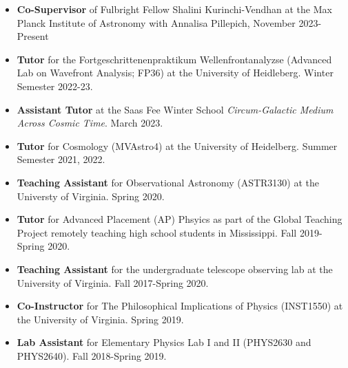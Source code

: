 \documentclass[a4paper,10pt,oneside]{article}
\begin{document}
\begin{itemize}[wide, labelwidth=!, labelindent=-11pt, parsep=0pt]
    \item {\bf Co-Supervisor} of Fulbright Fellow Shalini Kurinchi-Vendhan at the Max Planck Institute of Astronomy with Annalisa Pillepich, November 2023-Present
    \item {\bf Tutor} for the Fortgeschrittenenpraktikum Wellenfrontanalyzse (Advanced Lab on Wavefront Analysis; FP36) at the University of Heidleberg. Winter Semester 2022-23.
    \item {\bf Assistant Tutor} at the Saas Fee Winter School {\it Circum-Galactic Medium Across Cosmic Time}. March 2023. 
    \item {\bf Tutor} for Cosmology (MVAstro4) at the University of Heidelberg. Summer Semester 2021, 2022.
    \item {\bf Teaching Assistant} for Observational Astronomy (ASTR3130) at the Universty of Virginia. Spring 2020.
    \item {\bf Tutor} for Advanced Placement (AP) Phsyics as part of the Global Teaching Project remotely teaching high school students in Mississippi. Fall 2019-Spring 2020.
    \item {\bf Teaching Assistant} for the undergraduate telescope observing lab at the University of Virginia. Fall 2017-Spring 2020. 
    \item {\bf Co-Instructor} for The Philosophical Implications of Physics (INST1550) at the University of Virginia. Spring 2019.
    \item {\bf Lab Assistant} for Elementary Physics Lab I and II (PHYS2630 and PHYS2640). Fall 2018-Spring 2019. 
\end{itemize}

\noindent{}
\end{document}
